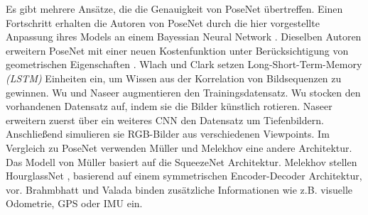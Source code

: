 Es gibt mehrere Ansätze, die die Genauigkeit von PoseNet  \cite{kendallPoseNetConvolutionalNetwork2015} übertreffen.
Einen Fortschritt erhalten die Autoren von PoseNet \cite{kendallPoseNetConvolutionalNetwork2015} durch die hier \cite{kendallModellingUncertaintyDeep2015a} vorgestellte Anpassung ihres Models an einem Bayessian Neural Network \cite{denkerTransformingNeuralNetOutput1991, mackayPracticalBayesianFramework1991}.
Dieselben Autoren erweitern PoseNet \cite{kendallPoseNetConvolutionalNetwork2015} mit einer neuen Kostenfunktion unter Berücksichtigung von geometrischen Eigenschaften \cite{kendallGeometricLossFunctions2017}. Wlach \etal\cite{walchImagebasedLocalizationUsing2016} und Clark \etal\cite{clarkVidLocDeepSpatioTemporal2017} setzen Long-Short-Term-Memory \textit{(LSTM)} \cite{hochreiterLongShortTermMemory1997a} Einheiten ein, um Wissen aus der Korrelation von Bildsequenzen zu gewinnen. Wu \etal\cite{wuDelvingDeeperConvolutional2017} und Naseer \etal\cite{naseerDeepRegressionMonocular2017} augmentieren den Trainingsdatensatz. Wu \etal\cite{wuDelvingDeeperConvolutional2017} stocken den vorhandenen Datensatz auf, indem sie die Bilder künstlich rotieren. Naseer \etal\cite{naseerDeepRegressionMonocular2017} erweitern zuerst über ein weiteres CNN den Datensatz um Tiefenbildern. Anschließend simulieren sie RGB-Bilder aus verschiedenen Viewpoints. Im Vergleich zu PoseNet  \cite{kendallPoseNetConvolutionalNetwork2015} verwenden Müller \etal\cite{mullerSQUEEZEPOSENETIMAGEBASED2017} und Melekhov \etal\cite{melekhovImageBasedLocalizationUsing2017} eine andere Architektur. 
Das Modell von Müller \etal\cite{mullerSQUEEZEPOSENETIMAGEBASED2017} basiert auf die SqueezeNet \cite{iandolaSqueezeNetAlexNetlevelAccuracy2016} Architektur. Melekhov \etal stellen HourglassNet \cite{melekhovImageBasedLocalizationUsing2017}, basierend auf einem symmetrischen Encoder-Decoder Architektur, vor. Brahmbhatt \etal\cite{brahmbhattGeometryAwareLearningMaps2018} und Valada \etal\cite{valadaDeepAuxiliaryLearning2018, valadaIncorporatingSemanticGeometric} binden zusätzliche Informationen wie z.B. visuelle Odometrie, GPS oder IMU ein. 

